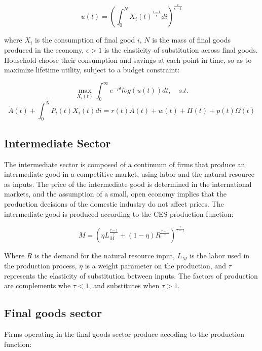 \documentclass{article}
\begin{document}
\[u(t) = \left( \int_0^{N} X_i(t)^{\frac{\epsilon -1}{\epsilon}} di \right)^{\frac{\epsilon}{\epsilon -1}}\]

where $X_i$ is the consumption of final good $i$, $N$ is the mass of final goods produced in the economy, $\epsilon>1$ is the elasticity of substitution across final goods. Household choose their consumption and savings at each point in time, so as to maximize lifetime utility, subject to a budget constraint:

\[\max_{X_i(t)}\int_0^{\infty}e^{-\rho t}log(u(t))dt,	\quad s.t.\]
\[\dot{A}(t) + \int_0^NP_i(t)X_i(t) di= r(t)A(t) + w(t)+\Pi(t) + p(t) \Omega(t)\]


\subsection{Intermediate Sector}

The intermediate sector is composed of a continuum of firms that produce an intermediate good in a competitive market, using labor and the natural resource as inputs. The price of the intermediate good is determined in the international markets, and the assumption of a small, open economy implies that the production decisions of the domestic industry do not affect prices. The intermediate good is produced according to the CES production function:

\[ M = \left( \eta L_M^{\frac{\tau - 1}{\tau}} + (1-\eta)R^{\frac{\tau -1}{\tau}}  \right)^{\frac{\tau}{\tau-1}} \]

Where $R$ is the demand for the natural resource input, $L_M$ is the labor used in the production process, $\eta$ is a weight parameter on the production, and $\tau$ represents the elasticity of substitution between inputs. The factors of production are complements whe $\tau<1$, and substitutes when $\tau>1$.

\subsection{Final goods sector}

Firms operating in the final goods sector produce accoding to the production function:

\[  \]
\end{document}
